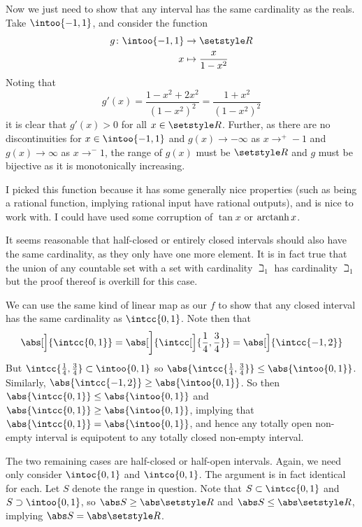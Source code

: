 Now we just need to show that any interval has the same cardinality as the
reals. Take \(\intoo{-1, 1}\), and consider the function
\begin{align*}
 g \colon \intoo{-1, 1} &\to \Reals \\
          x &\mapsto \frac x{1 - x^2}
\end{align*}
Noting that
\begin{equation*}
 g'(x) = \frac{1 - x^2 + 2x^2}{(1 - x^2)^2}
       = \frac{1 + x^2}{(1 - x^2)^2}
\end{equation*}
it is clear that \(g'(x) > 0\) for all \(x \in \Reals\). Further, as there are
no discontinuities for \(x \in \intoo{-1, 1}\) and \(g(x) \to -\infty\) as
\(x \to^+ -1\) and \(g(x) \to \infty\) as \(x \to^- 1\), the range of \(g(x)\)
must be \(\Reals\) and \(g\) must be bijective as it is monotonically
increasing.

I picked this function because it has some generally nice properties (such as
being a rational function, implying rational input have rational outputs), and
is nice to work with. I could have used some corruption of \(\tan x\) or
\(\operatorname{arctanh} x\).

It seems reasonable that half-closed or entirely closed intervals should also
have the same cardinality, as they only have one more element. It is in fact
true that the union of any countable set with a set with cardinality \(\beth_1\)
has cardinality \(\beth_1\) but the proof thereof is overkill for this case.

We can use the same kind of linear map as our \(f\) to show that any closed
interval has the same cardinality as \(\intcc{0, 1}\). Note then that
\begin{equation*}
 \abs[\Big]{\intcc{0, 1}} = \abs[\bigg]{\intcc[\Big]{\frac 14, \frac 34}} =
  \abs[\Big]{\intcc{-1, 2}}
\end{equation*}
But \(\intcc{\frac 14, \frac 34} \subset \intoo{0, 1}\) so
\(\abs{\intcc{\frac 14, \frac 34}} \le \abs{\intoo{0, 1}}\). Similarly,
\(\abs{\intcc{-1, 2}} \ge \abs{\intoo{0, 1}}\). So then
\(\abs{\intcc{0, 1}} \le \abs{\intoo{0, 1}}\) and
\(\abs{\intcc{0, 1}} \ge \abs{\intoo{0, 1}}\), implying that
\(\abs{\intcc{0, 1}} = \abs{\intoo{0, 1}}\), and hence any totally open
non-empty interval is equipotent to any totally closed non-empty interval.

The two remaining cases are half-closed or half-open intervals. Again, we need
only consider \(\intoc{0, 1}\) and \(\intco{0, 1}\). The argument is in fact
identical for each. Let \(S\) denote the range in question. Note that
\(S \subset \intcc{0, 1}\) and \(S \supset \intoo{0, 1}\), so
\(\abs S \ge \abs \Reals\) and \(\abs S \le \abs \Reals\), implying
\(\abs S = \abs \Reals\).

